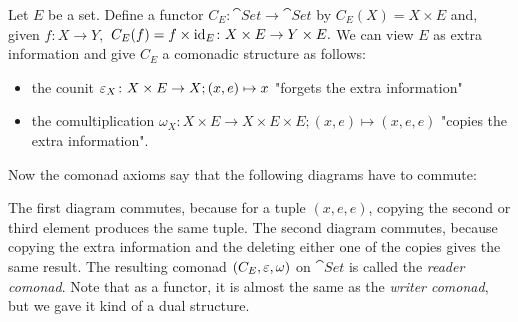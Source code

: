 \begin{example}
    Let $E$ be a set. Define a functor $C_E \colon \cat{Set} \to \cat{Set}$ by
    $C_E(X)=X \times E$ and, given $f \colon X \to Y,$ $C_E(f) = f \times \operatorname{id}_E
    \colon X \times E \to Y \times E.$
    We can view $E$ as \dq extra information\dq{} and give $C_E$ a comonadic structure as follows:
    \begin{itemize}
        \item the counit $\varepsilon_X \colon X \times E \to X; (x,e)\mapsto x$ 
         "forgets the extra information"
        \item the comultiplication $\omega_X \colon X \times E \to X \times E \times E;
        (x,e)\mapsto (x,e,e)$ 
        "copies the extra information".
    \end{itemize}
    Now the comonad axioms say that the following diagrams have to commute:
    \begin{figure}[H]
    \centering
    \begin{subfigure}{0.4\textwidth}
    \centering
    \end{subfigure}
    \hspace{2em}
    \begin{subfigure}{0.4\textwidth}
    \centering
    \end{subfigure}
    \end{figure}
    The first diagram commutes, because for a tuple $(x,e,e)$, copying the second or 
    third element produces the same tuple. The second diagram commutes, because copying 
    the extra information and the deleting either one of the copies gives the same result.
    The resulting comonad $(C_E,\varepsilon,\omega)$ on $\cat{Set}$ is called the \textit{reader comonad}.
    Note that as a functor, it is almost the same as the \textit{writer comonad}, but we gave it
    kind of a dual structure.
\end{example}


